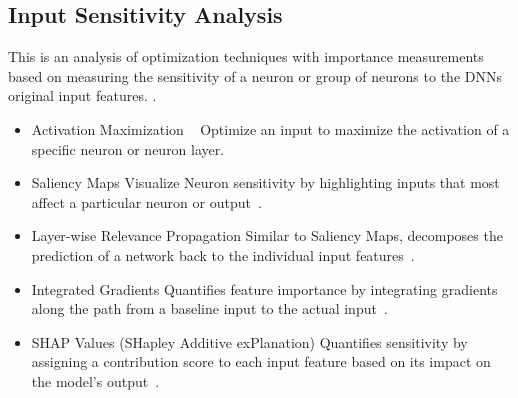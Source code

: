 
\subsection{Input Sensitivity Analysis}\label{subsec:individual-neuron-importance-analysis}

This is an analysis of optimization techniques with importance measurements based on measuring the sensitivity of a neuron or group of neurons to the DNNs original input features. \@.
\begin{itemize}
    \item Activation Maximization ~\cite{erhan2009visualizing}
    \subitem Optimize an input to maximize the activation of a specific neuron or neuron layer.
    \item Saliency Maps
    \subitem Visualize Neuron sensitivity by highlighting inputs that most affect a particular neuron or output~\cite{hsu2023explainable}.
    \item Layer-wise Relevance Propagation
    \subitem Similar to Saliency Maps, decomposes the prediction of a network back to the individual input features~\cite{jia2022interpreting}.
    \item Integrated Gradients
    \subitem Quantifies feature importance by integrating gradients along the path from a baseline input to the actual input~\cite{sundararajan2017axiomatic}.
    \item SHAP Values (SHapley Additive exPlanation)
    \subitem Quantifies sensitivity by assigning a contribution score to each input feature based on its impact on the model’s output~\cite{nohara2022explanation}.
\end{itemize}